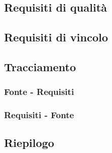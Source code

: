 \documentclass[../analisi-dei-requisiti.tex]{subfiles}
\begin{document}


\newpage

\subsection{Requisiti di qualità}
\label{sub:requisiti_di_qualita}

\newpage

\subsection{Requisiti di vincolo}
\label{sub:requisiti_di_vincolo}

\newpage

\subsection{Tracciamento}
\label{sub:tracciamento}

\subsubsection{Fonte - Requisiti}
\label{sssec:fonte_requisiti}

\subsubsection{Requisiti - Fonte}
\label{sssec:requisiti_fonte}

\subsection{Riepilogo}
\label{sub:riempilogo}
\end{document}
